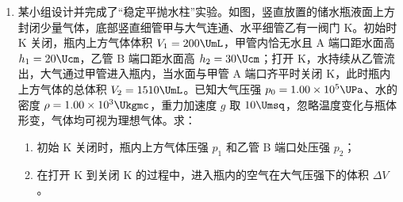 \documentclass[\gkver]{gaokaozhenti}
\begin{document}
\begin{enumerate}
{两式相乘可消去 $R_{a}$ 和 $R_{bc}$，解得 $R_{x}=\sqrt{R_{1}R_{2}}$，

故选 A。

②由上述分析可知 $R_{x}=\sqrt{R_{1}R_{2}}$。
}

\item
某小组设计并完成了“稳定平抛水柱”实验。如图，竖直放置的储水瓶液面上方封闭少量气体，底部竖直细管甲与大气连通、水平细管乙有一阀门 K。初始时 K 关闭，瓶内上方气体体积 $V_{1}=200\UmL$，甲管内恰无水且 A 端口距水面高 $h_{1}=20\Ucm$，乙管 B 端口距水面高 $h_{2}=30\Ucm$；打开 K，水持续从乙管流出，大气通过甲管进入瓶内，当水面与甲管 A 端口齐平时关闭 K，此时瓶内上方气体的总体积 $V_{2}=1510\UmL$。已知大气压强 $p_{0}=1.00\times10^{5}\UPa$、水的密度 $\rho=1.00\times10^{3}\Ukgmc$，重力加速度 $g$ 取 $10\Umsq$，忽略温度变化与瓶体形变，气体均可视为理想气体。求：
\begin{enumerate}
	\item
	初始 K 关闭时，瓶内上方气体压强 $p_{1}$ 和乙管 B 端口处压强 $p_{2}$；
	\item
	在打开 K 到关闭 K 的过程中，进入瓶内的空气在大气压强下的体积 $\Delta V$。
\end{enumerate}
\onepicture[align=right, w=4.46cm]{}

\end{enumerate}
\end{document}
